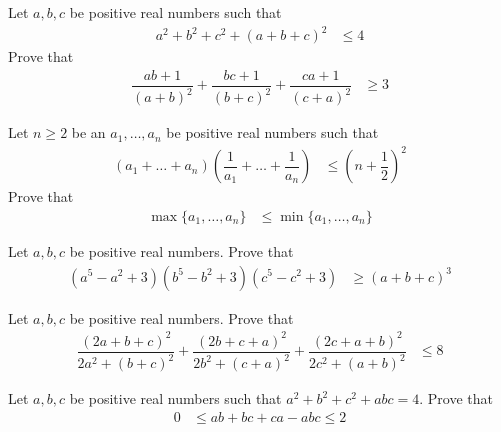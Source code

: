 \documentclass{subfile}
\begin{document}
		\begin{problem}
			Let $a,b,c$ be positive real numbers such that
				\begin{align*}
					a^{2}+b^{2}+c^{2}+(a+b+c)^{2}
						& \leq 4
				\end{align*}
			Prove that
				\begin{align*}
					\dfrac{ab+1}{(a+b)^{2}}+\dfrac{bc+1}{(b+c)^{2}}+\dfrac{ca+1}{(c+a)^{2}}
						& \geq3
				\end{align*}
		\end{problem}
	
		\begin{problem}
			Let $n\geq2$ be an $a_{1},\ldots,a_{n}$ be positive real numbers such that
				\begin{align*}
					(a_{1}+\ldots+a_{n})\left(\dfrac{1}{a_{1}}+\ldots+\dfrac{1}{a_{n}}\right)
						& \leq \left(n+\dfrac{1}{2}\right)^{2}
				\end{align*}
			Prove that
				\begin{align*}
					\max\{a_{1},\ldots,a_{n}\}
						& \leq\min\{a_{1},\ldots,a_{n}\}
				\end{align*}
		\end{problem}
	
		\begin{problem}
			Let $a,b,c$ be positive real numbers. Prove that
				\begin{align*}
					(a^{5}-a^{2}+3)(b^{5}-b^{2}+3)(c^{5}-c^{2}+3)
						& \geq (a+b+c)^{3}
				\end{align*}
		\end{problem}
	
		\begin{problem}
			Let $a,b,c$ be positive real numbers. Prove that
				\begin{align*}
					\dfrac{(2a+b+c)^{2}}{2a^{2}+(b+c)^{2}}+\dfrac{(2b+c+a)^{2}}{2b^{2}+(c+a)^{2}}+\dfrac{(2c+a+b)^{2}}{2c^{2}+(a+b)^{2}}
						& \leq 8
				\end{align*}
		\end{problem}
	
		\begin{problem}
			Let $a,b,c$ be positive real numbers such that $a^{2}+b^{2}+c^{2}+abc=4$. Prove that
				\begin{align*}
					0
						& \leq ab+bc+ca-abc\leq 2
				\end{align*}
		\end{problem}
	
\end{document}
